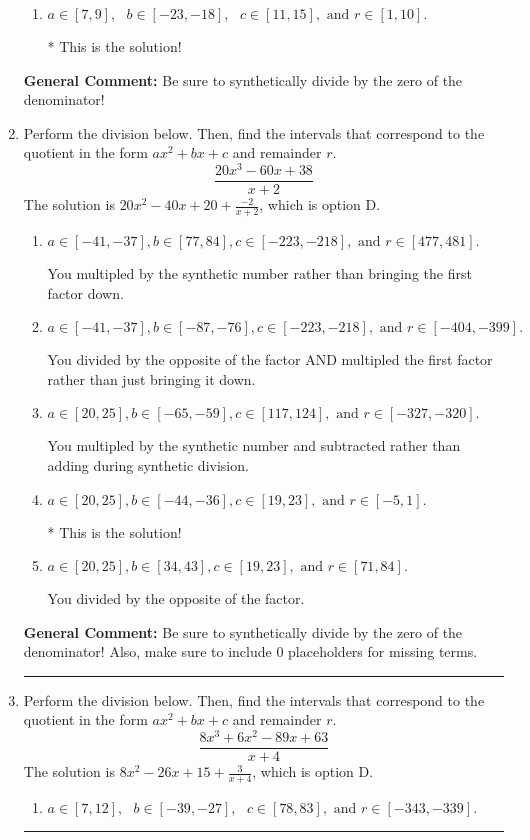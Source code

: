 \documentclass{extbook}[14pt]
\newcommand{\litem}[1]{\item #1

\rule{\textwidth}{0.4pt}}
\begin{document}
\begin{enumerate}
{\begin{enumerate}[label=\Alph*.]
 You multiplied by the synthetic number and subtracted rather than adding during synthetic division.
\item \( a \in [7, 9], \text{   } b \in [-23, -18], \text{   } c \in [11, 15], \text{   and   } r \in [1, 10]. \)

* This is the solution!
\end{enumerate}

\textbf{General Comment:} Be sure to synthetically divide by the zero of the denominator!
}
\litem{
Perform the division below. Then, find the intervals that correspond to the quotient in the form $ax^2+bx+c$ and remainder $r$.
\[ \frac{20x^{3} -60 x + 38}{x + 2} \]The solution is \( 20x^{2} -40 x + 20 + \frac{-2}{x + 2} \), which is option D.\begin{enumerate}[label=\Alph*.]
\item \( a \in [-41, -37], b \in [77, 84], c \in [-223, -218], \text{ and } r \in [477, 481]. \)

 You multipled by the synthetic number rather than bringing the first factor down.
\item \( a \in [-41, -37], b \in [-87, -76], c \in [-223, -218], \text{ and } r \in [-404, -399]. \)

 You divided by the opposite of the factor AND multipled the first factor rather than just bringing it down.
\item \( a \in [20, 25], b \in [-65, -59], c \in [117, 124], \text{ and } r \in [-327, -320]. \)

 You multipled by the synthetic number and subtracted rather than adding during synthetic division.
\item \( a \in [20, 25], b \in [-44, -36], c \in [19, 23], \text{ and } r \in [-5, 1]. \)

* This is the solution!
\item \( a \in [20, 25], b \in [34, 43], c \in [19, 23], \text{ and } r \in [71, 84]. \)

 You divided by the opposite of the factor.
\end{enumerate}

\textbf{General Comment:} Be sure to synthetically divide by the zero of the denominator! Also, make sure to include 0 placeholders for missing terms.
}
\litem{
Perform the division below. Then, find the intervals that correspond to the quotient in the form $ax^2+bx+c$ and remainder $r$.
\[ \frac{8x^{3} +6 x^{2} -89 x + 63}{x + 4} \]The solution is \( 8x^{2} -26 x + 15 + \frac{3}{x + 4} \), which is option D.\begin{enumerate}[label=\Alph*.]
\item \( a \in [7, 12], \text{   } b \in [-39, -27], \text{   } c \in [78, 83], \text{   and   } r \in [-343, -339]. \)


\end{enumerate}}
\end{enumerate}
\end{document}
